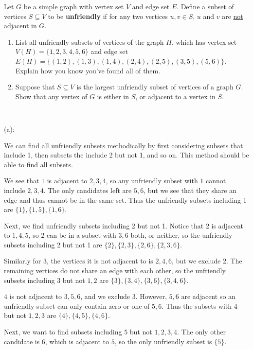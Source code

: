 \documentclass{eh-homework}
\begin{document}
    \begin{question}{1}
        Let $G$ be a simple graph with vertex set $V$ and edge set $E$. 
        Define a subset of vertices $S \subseteq V$ to be \textbf{unfriendly} if for any two vertices $u,v \in S$, $u$ and $v$ are \underline{not} adjacent in $G$. 
        \begin{enumerate}[label=(\alph*)]
            \item List all unfriendly subsets of vertices of the graph $H$, which has vertex set $V(H) = \{1,2,3,4,5,6\}$ and edge set $E(H) = \{(1,2),(1,3),(1,4),(2,4),(2,5),(3,5),(5,6)\}$. 
            Explain how you know you've found all of them.
            \item Suppose that $S \subseteq V$ is the largest unfriendly subset of vertices of a graph $G$. 
            Show that any vertex of $G$ is either in $S$, or adjacent to a vertex in $S$.
        \end{enumerate}
        \tcblower
        \ 

        (a):

        We can find all unfriendly subsets methodically by first considering subsets that include 1, then subsets the include 2 but not 1, and so on. This method should be able to find all subsets.

        We see that \(1\) is adjacent to \(2,3,4\), so any unfriendly subset with \(1\) cannot include \(2,3,4\). The only candidates left are \(5,6\), but we see that they share an edge and thus cannot be in the same set. Thus the unfriendly subsets including 1 are \(\{ 1 \} ,\{ 1,5 \} ,\{ 1,6 \}\).

        Next, we find unfriendly subsets including 2 but not 1. Notice that \(2\) is adjacent to \(1,4,5\), so \(2\) can be in a subset with \(3,6\) both, or neither, so the unfriendly subsets including 2 but not 1 are \(\{ 2 \} , \{ 2,3 \} , \{ 2,6 \} , \{ 2,3,6 \}\).

        Similarly for \(3\), the vertices it is not adjacent to is \(2,4,6\), but we exclude \(2\). The remaining vertices do not share an edge with each other, so the unfriendly subsets including \(3\) but not \(1,2\) are \(\{ 3 \} , \{ 3,4 \} , \{ 3,6 \} , \{ 3,4,6 \}\).

        \(4\) is not adjacent to \(3,5,6\), and we exclude \(3\). However, \(5,6\) are adjacent so an unfriendly subset can only contain zero or one of \(5,6\). Thus the subsets with 4 but not \(1,2,3\) are \(\{ 4 \}, \{ 4,5 \} , \{ 4,6 \}\).

        Next, we want to find subsets including \(5\) but not \(1,2,3,4\). The only other candidate is \(6\), which is adjacent to \(5\), so the only unfriendly subset is \(\{ 5 \}\).


\end{question}
\end{document}
